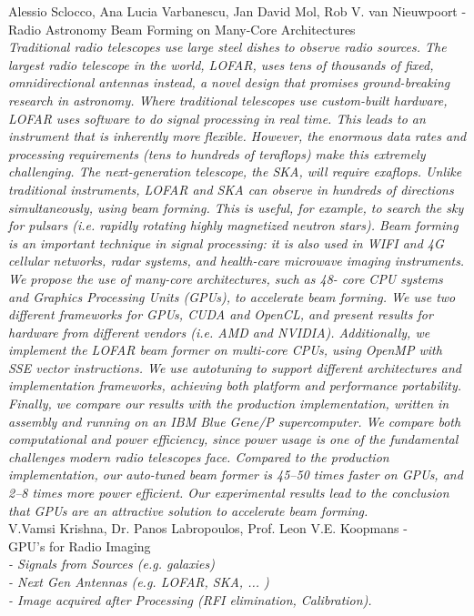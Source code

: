 \noindent
{\large Alessio Sclocco, Ana Lucia Varbanescu, Jan David Mol, Rob V. van Nieuwpoort - \hfill \\ Radio Astronomy Beam Forming on Many-Core Architectures }\\
\indent \textit{Traditional radio telescopes use large steel dishes
to observe radio sources. The largest radio telescope in
the world, LOFAR, uses tens of thousands of fixed, omnidirectional
antennas instead, a novel design that promises
ground-breaking research in astronomy. Where traditional telescopes
use custom-built hardware, LOFAR uses software to do
signal processing in real time. This leads to an instrument that
is inherently more flexible. However, the enormous data rates
and processing requirements (tens to hundreds of teraflops)
make this extremely challenging. The next-generation telescope,
the SKA, will require exaflops. Unlike traditional instruments,
LOFAR and SKA can observe in hundreds of directions
simultaneously, using beam forming. This is useful, for example,
to search the sky for pulsars (i.e. rapidly rotating highly
magnetized neutron stars). Beam forming is an important
technique in signal processing: it is also used in WIFI and 4G
cellular networks, radar systems, and health-care microwave
imaging instruments.
We propose the use of many-core architectures, such as 48-
core CPU systems and Graphics Processing Units (GPUs), to
accelerate beam forming. We use two different frameworks for
GPUs, CUDA and OpenCL, and present results for hardware
from different vendors (i.e. AMD and NVIDIA). Additionally,
we implement the LOFAR beam former on multi-core CPUs,
using OpenMP with SSE vector instructions. We use autotuning
to support different architectures and implementation
frameworks, achieving both platform and performance portability.
Finally, we compare our results with the production
implementation, written in assembly and running on an IBM
Blue Gene/P supercomputer. We compare both computational
and power efficiency, since power usage is one of the fundamental
challenges modern radio telescopes face. Compared to
the production implementation, our auto-tuned beam former
is 45–50 times faster on GPUs, and 2–8 times more power
efficient. Our experimental results lead to the conclusion that
GPUs are an attractive solution to accelerate beam forming.
}\\

\noindent
{\large V.Vamsi Krishna, Dr. Panos Labropoulos, Prof. Leon V.E. Koopmans  - \hfill \\ GPU's for Radio Imaging}\\
 \textit{- Signals from Sources (e.g. galaxies)\\
- Next Gen Antennas (e.g. LOFAR, SKA, ... )\\
- Image acquired after Processing (RFI elimination, Calibration).
}\\

